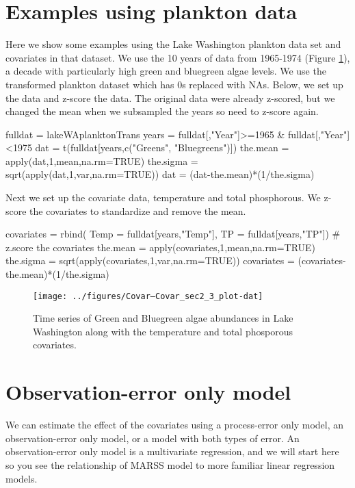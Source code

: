 \section{Examples using plankton data}
Here we show some examples using the Lake Washington plankton data set and covariates in that dataset.  We use the 10 years of data from 1965-1974 (Figure \ref{fig:plank-plot}), a decade with particularly high green and bluegreen algae levels. We use the transformed plankton dataset which has 0s replaced with NAs. Below, we set up the data and z-score the data. The original data were already z-scored, but  we changed the mean when we subsampled the years so need to z-score again. 
\begin{Schunk}
\begin{Sinput}
 fulldat = lakeWAplanktonTrans
 years = fulldat[,"Year"]>=1965 & fulldat[,"Year"]<1975
 dat = t(fulldat[years,c("Greens", "Bluegreens")])
 the.mean = apply(dat,1,mean,na.rm=TRUE)
 the.sigma = sqrt(apply(dat,1,var,na.rm=TRUE))
 dat = (dat-the.mean)*(1/the.sigma)
\end{Sinput}
\end{Schunk}
Next we set up the covariate data, temperature and total phosphorous. We z-score the covariates to standardize and remove the mean.
\begin{Schunk}
\begin{Sinput}
 covariates = rbind(
    Temp = fulldat[years,"Temp"],
    TP = fulldat[years,"TP"])
 # z.score the covariates
 the.mean = apply(covariates,1,mean,na.rm=TRUE)
 the.sigma = sqrt(apply(covariates,1,var,na.rm=TRUE))
 covariates = (covariates-the.mean)*(1/the.sigma)
\end{Sinput}
\end{Schunk}
\begin{figure}[htp]
\begin{center}
\texttt{[image: ../figures/Covar--Covar\_sec2\_3\_plot-dat]}
\end{center}
\caption{Time series of Green and Bluegreen algae abundances in Lake Washington along with the temperature and total phosporous covariates.}
\label{fig:plank-plot}
\end{figure}

\section{Observation-error only model}

We can estimate the effect of the covariates using a process-error only model, an observation-error only model, or a model with both types of error.  An observation-error only model is a multivariate regression, and we will start here so you see the relationship of MARSS model to more familiar linear regression models.

